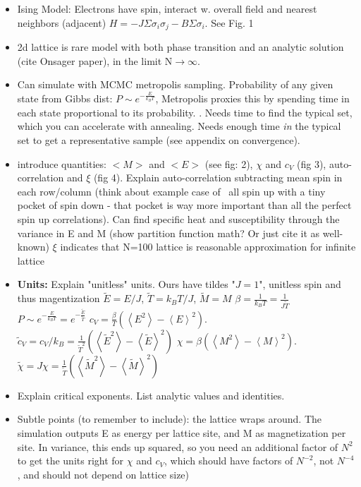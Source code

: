 \documentclass[letter,scriptaddress,twocolumn, prl]{revtex4}
\begin{document}
\begin{itemize}
	\item Ising Model: Electrons have spin, interact w. overall field and nearest neighbors (adjacent) $H = -J \Sigma \sigma_i \sigma_j - B\Sigma \sigma_i$. See Fig. 1
	\item 2d lattice is rare model with both phase transition and an analytic solution (cite Onsager paper), in the limit N$\rightarrow\infty$. 
	\item Can simulate with MCMC metropolis sampling. Probability of any given state from Gibbs dist: $P \sim e^{-\frac{E}{k_BT}}$, Metropolis proxies this by spending time in each state proportional to its probability. 
	. 
	\subitem Needs time to find the typical set, which you can accelerate with annealing. Needs enough time \textit{in} the typical set to get a representative sample (see appendix on convergence).
	\item introduce quantities: $<M>$ and $<E>$ (see fig: 2), $\chi$ and $c_V$ (fig 3), auto-correlation and $\xi$ (fig 4). Explain auto-correlation subtracting mean spin in each row/column (think about example case of ~all spin up with a tiny pocket of spin down - that pocket is way more important than all the perfect spin up correlations).
	\subitem Can find specific heat and susceptibility through the variance in E and M (show partition function math? Or just cite it as well-known)
	\subitem $\xi$ indicates that N=100 lattice is reasonable approximation for infinite lattice
	\item \textbf{Units:} Explain "unitless" units. Ours have tildes
	\subitem "$J = 1$", unitless spin and thus magentization
	\subitem $\tilde{E} = E/J$, $\tilde{T} = k_BT/J$, $\tilde{M} = M $
	\subitem $\beta = \frac{1}{k_BT} = \frac{1}{J\tilde{T}}$
	\subitem $P \sim e^{-\frac{E}{k_BT}} = e^{-\frac{\tilde{E}}{\tilde{T}}}$
	\subitem $c_V = \frac{\beta}{T}(\left\langle E^2 \right\rangle - \left\langle E \right\rangle ^2)$. $\tilde{c}_V = c_V / k_B = \frac{1}{\tilde{T}^2}(\left\langle \tilde{E}^2 \right\rangle - \left\langle \tilde{E} \right\rangle ^2)$
	\subitem $\chi = \beta(\left\langle M^2 \right\rangle - \left\langle M \right\rangle ^2)$. $\tilde{\chi} = J\chi = \frac{1}{\tilde{T}}(\left\langle \tilde{M}^2 \right\rangle - \left\langle \tilde{M} \right\rangle ^2)$
	\item Explain critical exponents. List analytic values and identities.
	\item Subtle points (to remember to include): 
	\subitem the lattice wraps around. 
	\subitem The simulation outputs E as energy per lattice site, and M as magnetization per site. In variance, this ends up squared, so you need an additional factor of $N^2$ to get the units right for $\chi$ and $c_V$, which should have factors of $N^{-2}$, not $N^{-4}$, and should not depend on lattice size)
\end{itemize}
\end{document}

